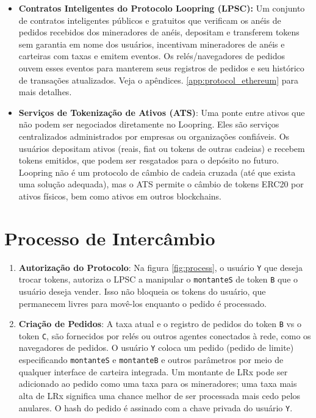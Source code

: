 \documentclass[UTF8,nofonts]{article}
\begin{document}
\begin{multicols}{2}
\begin{itemize}
\item \textbf{Contratos Inteligentes do Protocolo Loopring (LPSC):} Um conjunto de contratos inteligentes públicos e gratuitos que verificam os anéis de pedidos recebidos dos mineradores de anéis, depositam e transferem tokens sem garantia em nome dos usuários, incentivam mineradores de anéis e carteiras com taxas e emitem eventos. Os relés/navegadores de pedidos ouvem esses eventos para manterem seus registros de pedidos e seu histórico de transações atualizados. Veja o apêndices.
 \ref{app:protocol_ethereum} para mais detalhes.

\item \textbf{Serviços de Tokenização de Ativos (ATS)}: Uma ponte entre ativos que não podem ser negociados diretamente no Loopring. Eles são serviços centralizados administrados por empresas ou organizações confiáveis. Os usuários depositam ativos (reais, fiat ou tokens de outras cadeias) e recebem tokens emitidos, que podem ser resgatados para o depósito no futuro. Loopring não é um protocolo de câmbio de cadeia cruzada (até que exista uma solução adequada), mas o ATS permite o câmbio de tokens ERC20 \cite{ERC20} por ativos físicos, bem como ativos em outros blockchains. 

\end{itemize}

\section{Processo de Intercâmbio\label{sec:process}}

\begin{enumerate} 


\item \textbf{Autorização do Protocolo}: Na figura \ref{fig:process}, o usuário \verb|Y| que deseja trocar tokens, autoriza o LPSC a manipular o  \verb|montanteS| de token \verb|B| que o usuário deseja vender. Isso não bloqueia os tokens do usuário, que permanecem livres para movê-los enquanto o pedido é processado.

\item \textbf{Criação de Pedidos}:  A taxa atual e o registro de pedidos do token \verb|B| vs o token \verb|C|,  são fornecidos por relés ou outros agentes conectados à rede, como os navegadores de pedidos. O usuário \verb|Y| coloca um pedido (pedido de limite) especificando \verb|montanteS| e \verb|montanteB| e outros parâmetros por meio de qualquer interface de carteira integrada. Um montante de LRx pode ser adicionado ao pedido como uma taxa para os mineradores; uma taxa mais alta de LRx significa uma chance melhor de ser processada mais cedo pelos anulares. O hash do pedido é assinado com a chave privada do usuário \verb|Y|.


\end{enumerate}
\end{multicols}
\end{document}

